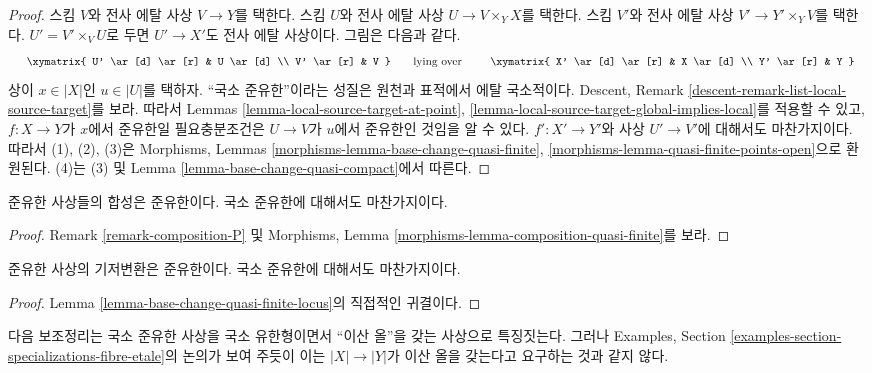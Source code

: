 \begin{proof}
스킴 $V$와 전사 에탈 사상 $V \to Y$를 택한다.
스킴 $U$와 전사 에탈 사상 $U \to V \times_Y X$를 택한다.
스킴 $V'$와 전사 에탈 사상 $V' \to Y' \times_Y V$를 택한다.
$U' = V' \times_V U$로 두면 $U' \to X'$도 전사 에탈 사상이다.
그림은 다음과 같다.
$$
\vcenter{
\xymatrix{
U' \ar[d] \ar[r] & U \ar[d] \\
V' \ar[r] & V
}
}
\quad\text{lying over}\quad
\vcenter{
\xymatrix{
X' \ar[d] \ar[r] & X \ar[d] \\
Y' \ar[r] & Y
}
}
$$
상이 $x \in |X|$인 $u \in |U|$를 택하자.
“국소 준유한”이라는 성질은 원천과 표적에서 에탈 국소적이다.
Descent, Remark \ref{descent-remark-list-local-source-target}를 보라.
따라서 Lemmas \ref{lemma-local-source-target-at-point},
\ref{lemma-local-source-target-global-implies-local}를 적용할 수 있고,
$f : X \to Y$가 $x$에서 준유한일 필요충분조건은
$U \to V$가 $u$에서 준유한인 것임을 알 수 있다.
$f' : X' \to Y'$와 사상 $U' \to V'$에 대해서도 마찬가지이다.
따라서 (1), (2), (3)은 Morphisms, Lemmas
\ref{morphisms-lemma-base-change-quasi-finite},
\ref{morphisms-lemma-quasi-finite-points-open}으로 환원된다.
(4)는 (3) 및 Lemma \ref{lemma-base-change-quasi-compact}에서 따른다.
\end{proof}

\begin{lemma}
\label{lemma-composition-quasi-finite}
준유한 사상들의 합성은 준유한이다.
국소 준유한에 대해서도 마찬가지이다.
\end{lemma}

\begin{proof}
Remark \ref{remark-composition-P} 및 Morphisms, Lemma
\ref{morphisms-lemma-composition-quasi-finite}를 보라.
\end{proof}

\begin{lemma}
\label{lemma-base-change-quasi-finite}
준유한 사상의 기저변환은 준유한이다.
국소 준유한에 대해서도 마찬가지이다.
\end{lemma}

\begin{proof}
Lemma \ref{lemma-base-change-quasi-finite-locus}의 직접적인 귀결이다.
\end{proof}

\noindent
다음 보조정리는 국소 준유한 사상을 국소 유한형이면서
“이산 올”을 갖는 사상으로 특징짓는다. 그러나 Examples, Section
\ref{examples-section-specializations-fibre-etale}의 논의가 보여 주듯이
이는 $|X| \to |Y|$가 이산 올을 갖는다고 요구하는 것과 같지 않다.

